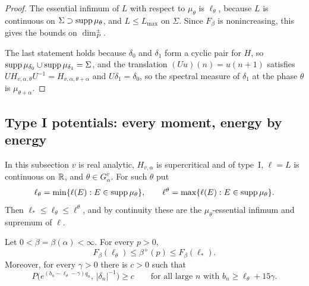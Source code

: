 \begin{proof}
The essential infimum of $L$ with respect to $\mu_\theta$ is $\ell_\theta$, because $L$ is continuous on $\Sigma\supset\operatorname{supp}\mu_\theta$, and $L\le L_{\max}$ on $\Sigma$. Since $F_\beta$ is nonincreasing, this gives the bounds on $\dim_P^\pm$.

The last statement holds because $\delta_0$ and $\delta_1$ form a cyclic pair for $H$, so $\operatorname{supp}\mu_{\delta_0}\cup\operatorname{supp}\mu_{\delta_1}=\Sigma$, and the translation $(Uu)(n)=u(n+1)$ satisfies $UH_{v,\alpha,\theta}U^{-1}=H_{v,\alpha,\theta+\alpha}$ and $U\delta_1=\delta_0$, so the spectral measure of $\delta_1$ at the phase $\theta$ is $\mu_{\theta+\alpha}$.
\end{proof}

\subsection{Type I potentials: every moment, energy by energy}\label{sec:typeI-moments}

In this subsection $v$ is real analytic, $H_{v,\alpha}$ is supercritical and of type~I, $\ell=L$ is continuous on $\mathbb R$, and $\theta\in G^v_\alpha$. For such $\theta$ put
\[
\ell_\theta=\min\{\ell(E):E\in\operatorname{supp}\mu_\theta\},\qquad\ell^\theta=\max\{\ell(E):E\in\operatorname{supp}\mu_\theta\}.
\]
Then $\ell_*\le\ell_\theta\le\ell^\theta$, and by continuity these are the $\mu_\theta$-essential infimum and supremum of $\ell$.

\begin{theorem}\label{thm:U2}
Let $0<\beta=\beta(\alpha)<\infty$. For every $p>0$,
\[
F_\beta(\ell_\theta)\le\beta^+(p)\le F_\beta(\ell_*).
\]
Moreover, for every $\gamma>0$ there is $c>0$ such that
\[
P\bigl(e^{(b_n-\ell_\theta-\gamma)q_n},\,|\delta_n|^{-1}\bigr)\ge c\qquad\text{for all large }n\text{ with }b_n\ge\ell_\theta+15\gamma.
\]
\end{theorem}

